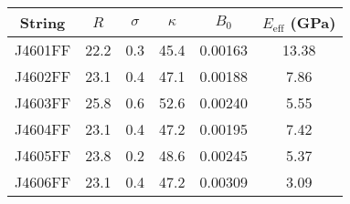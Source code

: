 \begin{tabular}{cccccc}
\toprule
String & $R$ & $\sigma$ & $\kappa$ & $B_0$ & $E_\mathrm{eff}$ (GPa) \\
\midrule
J4601FF & 22.2 & 0.3 & 45.4 & 0.00163 & 13.38 \\
J4602FF & 23.1 & 0.4 & 47.1 & 0.00188 & 7.86 \\
J4603FF & 25.8 & 0.6 & 52.6 & 0.00240 & 5.55 \\
J4604FF & 23.1 & 0.4 & 47.2 & 0.00195 & 7.42 \\
J4605FF & 23.8 & 0.2 & 48.6 & 0.00245 & 5.37 \\
J4606FF & 23.1 & 0.4 & 47.2 & 0.00309 & 3.09 \\
\bottomrule
\end{tabular}

